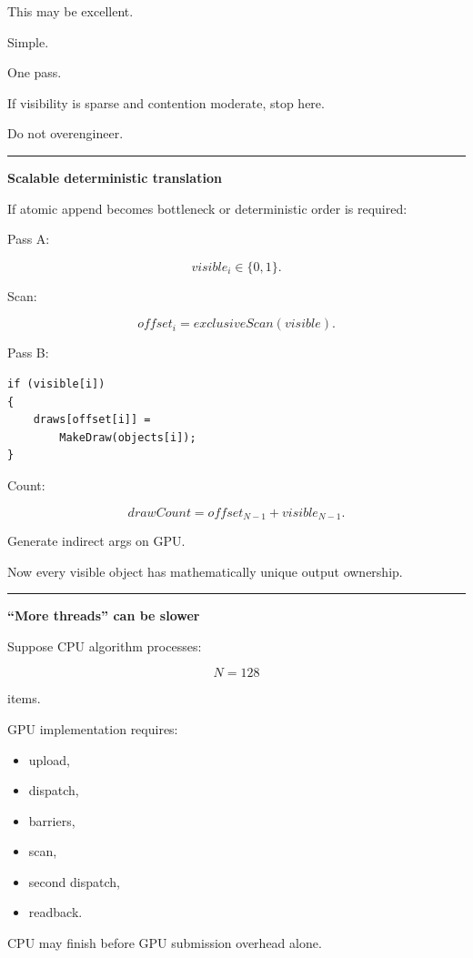 This may be excellent.

Simple.

One pass.

If visibility is sparse and contention moderate, stop here.

Do not overengineer.

\begin{center}\rule{0.5\linewidth}{0.5pt}\end{center}

\textbf{Scalable deterministic translation}

If atomic append becomes bottleneck or deterministic order is required:

Pass A:

\[
visible_i\in\{0,1\}.
\]

Scan:

\[
offset_i=
exclusiveScan(visible).
\]

Pass B:

\protect{}\label{p10-scan-cull}%
\begin{verbatim}
if (visible[i])
{
    draws[offset[i]] =
        MakeDraw(objects[i]);
}
\end{verbatim}

Count:

\[
drawCount=
offset_{N-1}
+
visible_{N-1}.
\]

Generate indirect args on GPU.

Now every visible object has mathematically unique output ownership.

\begin{center}\rule{0.5\linewidth}{0.5pt}\end{center}

\textbf{``More threads'' can be slower}

Suppose CPU algorithm processes:

\[
N=128
\]

items.

GPU implementation requires:

\begin{itemize}
\tightlist
\item
  upload,
\item
  dispatch,
\item
  barriers,
\item
  scan,
\item
  second dispatch,
\item
  readback.
\end{itemize}

CPU may finish before GPU submission overhead alone.

